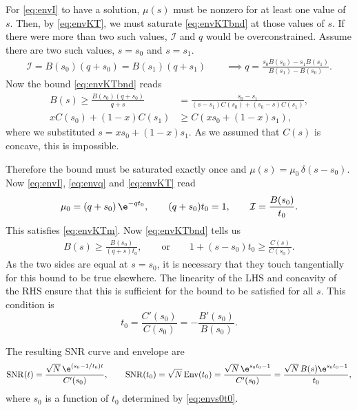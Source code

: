 \documentclass[12pt]{article}
\DeclareMathOperator{\snr}{SNR}
\DeclareMathOperator{\env}{Env}
\newcommand{\CI}{\mathcal{I}}
\begin{document}
For \eqref{eq:envI} to have a solution, $\mu(s)$ must be nonzero for at least one value of $s$.
Then, by \eqref{eq:envKT}, we must saturate \eqref{eq:envKTbnd} at those values of $s$.
If there were more than two such values, $\CI$ and $q$ would be overconstrained.
Assume there are two such values, $s=s_0$ and $s=s_1$.
%
\begin{equation}\label{eq:sattwice}
\begin{aligned}
  \CI = B(s_0)(q+s_0) = B(s_1)(q+s_1)
  \qquad
  \implies q = \frac{s_0 B(s_0) - s_1 B(s_1)}{B(s_1)-B(s_0)}.
\end{aligned}
\end{equation}
%
Now the bound \eqref{eq:envKTbnd} reads
%
\begin{equation}\label{eq:satwicebnd}
\begin{aligned}
  B(s) \geq \frac{B(s_0)(q+s_0)}{q+s} &= \frac{s_0-s_1}{(s-s_1)C(s_0)+(s_0-s)C(s_1)}, \\
  xC(s_0)+(1-x)C(s_1) &\geq C(xs_0+(1-x)s_1),
\end{aligned}
\end{equation}
%
where we substituted $s=xs_0+(1-x)s_1$.
As we assumed that $C(s)$ is concave, this is impossible.

Therefore the bound must be saturated exactly once and $\mu(s)=\mu_0\,\delta(s-s_0)$.
Now \eqref{eq:envI}, \eqref{eq:envq} and \eqref{eq:envKT} read
%
\begin{equation}\label{eq:satonce}
  \mu_0 = (q+s_0)\,\e^{-qt_0},
  \qquad
  (q+s_0)t_0 = 1,
  \qquad
  \CI = \frac{B(s_0)}{t_0}.
\end{equation}
%
This satisfies \eqref{eq:envKTm}.
Now \eqref{eq:envKTbnd} tells us
%
\begin{equation}\label{eq:satoncebnd}
\begin{aligned}
  B(s) \geq \frac{B(s_0)}{(q+s)t_0},
  \qquad\text{or}\qquad
  1 + (s-s_0)t_0 \geq \frac{C(s)}{C(s_0)}.
\end{aligned}
\end{equation}
%
As the two sides are equal at $s=s_0$, it is necessary that they touch tangentially for this bound to be true elsewhere.
The linearity of the LHS and concavity of the RHS ensure that this is sufficient for the bound to be satisfied for all $s$.
This condition is
%
\begin{equation}\label{eq:envs0t0}
  t_0 = \frac{C'(s_0)}{C(s_0)} = -\frac{B'(s_0)}{B(s_0)}.
\end{equation}
%

The resulting SNR curve and envelope are
%
\begin{equation}\label{eq:env}
  \snr(t) = \frac{\sqrt{N}\,\e^{(s_0-1/t_0)t}}{C'(s_0)},
  \qquad
  \snr(t_0) = \sqrt{N}\env(t_0) = \frac{\sqrt{N}\,\e^{s_0t_0-1}}{C'(s_0)}
   = \frac{\sqrt{N}\,B(s)\e^{s_0t_0-1}}{t_0},
\end{equation}
%
where $s_0$ is a function of $t_0$ determined by \eqref{eq:envs0t0}.
\end{document}
